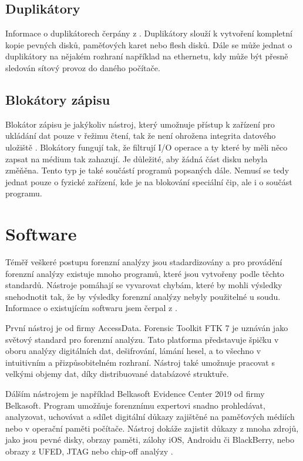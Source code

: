 \documentclass[thesis=B,czech]{FITthesis}[2012/06/26]
\begin{document}
\subsection{Duplikátory}
Informace o duplikátorech čerpány z \cite{for_hard}. Duplikátory slouží k vytvoření kompletní kopie pevných disků, paměťových karet nebo flesh disků. Dále se může jednat o duplikátory na nějakém rozhraní například na ethernetu, kdy může být přesně sledován sítový provoz do daného počítače.
\subsection{Blokátory zápisu}
Blokátor zápisu je jakýkoliv nástroj, který umožnuje přístup k zařízení pro ukládání dat pouze v řežimu čtení, tak že není ohrožena integrita datového uložiště \cite{for_hard2}. Blokátory fungují tak, že filtrují I/O operace a ty které by měli něco zapsat na médium tak zahazují. Je důležité, aby žádná část disku nebyla změňěna. Tento typ je také součástí programů popsaných dále. Nemusí se tedy jednat pouze o fyzické zařízení, kde je na blokování speciální čip, ale i o součást programu.

\section{Software}

Téměř veškeré postupu forenzní analýzy jsou stadardizovány a pro provádění forenzní analýzy existuje mnoho programů, které jsou vytvořeny podle těchto standardů. Nástroje pomáhají se vyvarovat chybám, které by mohli výsledky snehodnotit tak, že by výsledky forenzní analýzy nebyly použitelné u soudu. Informace o existujícím softwaru jsem čerpal z \cite{for_soft}.

První nástroj je od firmy AccessData. Forensic Toolkit FTK 7 je uznáván jako světový standard pro forenzní analýzu. Tato platforma představuje špičku v oboru analýzy digitálních dat, dešifrování, lámání hesel, a to všechno v intuitivním a přizpůsobitelném rozhraní. Nástroj také umožnuje pracovat s velkými objemy dat, díky distribuované databázové struktuře.

Dálším nástrojem je například Belkasoft Evidence Center 2019 od firmy Belkasoft. Program umožňuje forenznímu expertovi snadno prohledávat, analyzovat, uchovávat a sdílet digitální důkazy zajištěné na paměťových médiích nebo v operační paměti počítače. Nástroj dokáže zajistit důkazy z mnoha zdrojů, jako jsou pevné disky, obrzay paměti, zálohy iOS, Androidu či BlackBerry, nebo obrazy z UFED, JTAG nebo chip-off analýzy \cite{for_soft}.
\end{document}
